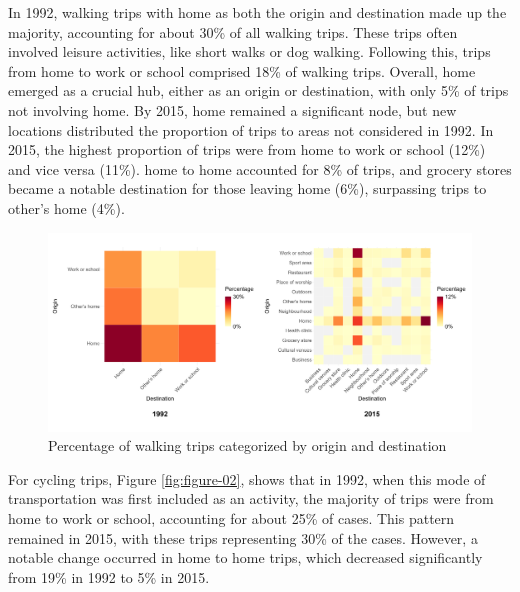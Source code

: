 \documentclass[Royal,times,sageh]{sagej}
\begin{document}
In 1992, walking trips with home as both the origin and destination made
up the majority, accounting for about 30\% of all walking trips. These
trips often involved leisure activities, like short walks or dog
walking. Following this, trips from home to work or school comprised
18\% of walking trips. Overall, home emerged as a crucial hub, either as
an origin or destination, with only 5\% of trips not involving home. By
2015, home remained a significant node, but new locations distributed
the proportion of trips to areas not considered in 1992. In 2015, the
highest proportion of trips were from home to work or school (12\%) and
vice versa (11\%). home to home accounted for 8\% of trips, and grocery
stores became a notable destination for those leaving home (6\%),
surpassing trips to other's home (4\%).

\begin{figure}

{\centering \includegraphics[width=1\linewidth]{Manuscript-figures/walking_hm_fig} 

}

\caption{Percentage of walking trips categorized by origin and destination}\label{fig:figure-01}
\end{figure}

For cycling trips, Figure \ref{fig:figure-02}, shows that in 1992, when
this mode of transportation was first included as an activity, the
majority of trips were from home to work or school, accounting for about
25\% of cases. This pattern remained in 2015, with these trips
representing 30\% of the cases. However, a notable change occurred in
home to home trips, which decreased significantly from 19\% in 1992 to
5\% in 2015.
\end{document}
